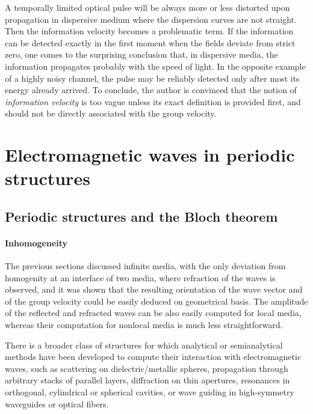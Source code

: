 A temporally limited optical pulse will be always more or less distorted upon propagation in dispersive medium where the dispersion curves are not straight. Then the information velocity becomes a problematic term. If the information can be detected exactly in the first moment when the fields deviate from strict zero, one comes to the surprising conclusion that, in dispersive media, the information propagates probably with the speed of light. In the opposite example of a highly noisy channel, the pulse may be reliably detected only after most its energy already arrived. To conclude, the author is convinced that the notion of \textit{information velocity} is too vague unless its exact definition is provided first, and should not be directly associated with the group velocity. 

\section{Electromagnetic waves in periodic structures}%
\subsection{Periodic structures and the Bloch theorem}
\paragraph{Inhomogeneity}%
The previous sections discussed infinite media, with the only deviation from homogenity at an interface of two media, where refraction of the waves is observed, and it was shown that the resulting orientation of the wave vector and of the group velocity could be easily deduced on geometrical basis. The amplitude of the reflected and refracted waves can be also easily computed for local media, whereas their computation for nonlocal media is much less straightforward. 

There is a broader class of structures for which analytical or semianalytical methods have been developed to compute their interaction with electromagnetic waves, such as scattering on dielectric/metallic spheres, propagation through arbitrary stacks of parallel layers, diffraction on thin apertures, resonances in orthogonal, cylindrical or spherical cavities, or wave guiding in high-symmetry waveguides or optical fibers. 

